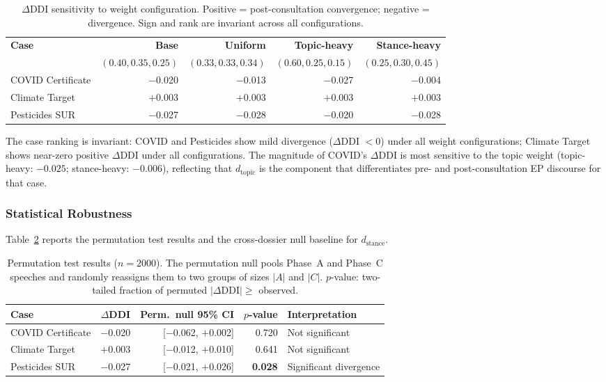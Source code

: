 \documentclass[sigconf,natbib]{acmart}
\begin{document}
\begin{table}[h]
\centering
\small
\begin{tabular}{lrrrr}
\toprule
\textbf{Case} & \textbf{Base} & \textbf{Uniform} & \textbf{Topic-heavy} & \textbf{Stance-heavy} \\
              & $(0.40,0.35,0.25)$ & $(0.33,0.33,0.34)$ & $(0.60,0.25,0.15)$ & $(0.25,0.30,0.45)$ \\
\midrule
COVID Certificate  & $-$0.020 & $-$0.013 & $-$0.027 & $-$0.004 \\
Climate Target     & $+$0.003 & $+$0.003 & $+$0.003 & $+$0.003 \\
Pesticides SUR     & $-$0.027 & $-$0.028 & $-$0.020 & $-$0.028 \\
\bottomrule
\end{tabular}
\caption{$\Delta$DDI sensitivity to weight configuration.
Positive = post-consultation convergence; negative = divergence.
Sign and rank are invariant across all configurations.}
\label{tab:sensitivity}
\end{table}

The case ranking is invariant: COVID and Pesticides show mild divergence ($\Delta$DDI $< 0$)
under all weight configurations; Climate Target shows near-zero positive $\Delta$DDI under all
configurations. The magnitude of COVID's $\Delta$DDI is most sensitive to the topic weight
(topic-heavy: $-0.025$; stance-heavy: $-0.006$), reflecting that $d_{\text{topic}}$ is the
component that differentiates pre- and post-consultation EP discourse for that case.

\subsubsection{Statistical Robustness}
\label{sec:robustness}

Table~\ref{tab:perm} reports the permutation test results and the cross-dossier null
baseline for $d_{\text{stance}}$.

\begin{table}[h]
\centering
\small
\begin{tabular}{lrrrl}
\toprule
\textbf{Case} & $\Delta$\textbf{DDI} & \textbf{Perm.\ null 95\% CI} & $p$\textbf{-value} & \textbf{Interpretation} \\
\midrule
COVID Certificate & $-$0.020 & [$-$0.062, $+$0.002] & 0.720 & Not significant \\
Climate Target    & $+$0.003 & [$-$0.012, $+$0.010] & 0.641 & Not significant \\
Pesticides SUR    & $-$0.027 & [$-$0.021, $+$0.026] & \textbf{0.028} & Significant divergence \\
\bottomrule
\end{tabular}
\caption{Permutation test results ($n=2000$). The permutation null pools Phase~A and Phase~C
speeches and randomly reassigns them to two groups of sizes $|A|$ and $|C|$.
$p$-value: two-tailed fraction of permuted $|\Delta\text{DDI}| \geq$ observed.}
\label{tab:perm}
\end{table}
\end{document}
